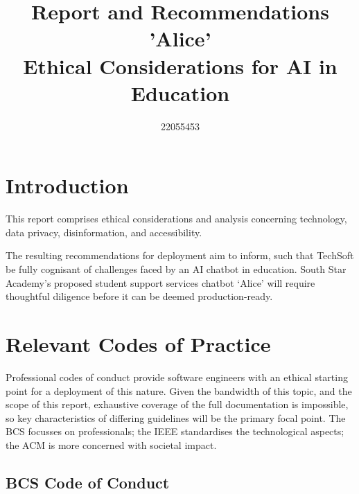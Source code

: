 \documentclass[14pt,a4paper]{article}
\title{Report and Recommendations\\ 'Alice' \\ Ethical Considerations for AI in Education}
\author{22055453}
\date{}
\begin{document}
\maketitle
\thispagestyle{empty}

\newpage

\tableofcontents
{}

\newpage


\begin{multicols}{2}
\section{Introduction}
This report comprises ethical considerations and analysis concerning technology, data privacy, disinformation, and accessibility.

The resulting recommendations for deployment aim to inform, such that TechSoft be fully cognisant of challenges faced by an AI chatbot in education.
South Star Academy's proposed student support services chatbot `Alice' will require thoughtful diligence before it can be deemed production-ready.






\section{Relevant Codes of Practice}

Professional codes of conduct provide software engineers with an ethical starting point for a deployment of this nature.
Given the bandwidth of this topic, and the scope of this report, exhaustive coverage of the full documentation is impossible, so key characteristics of differing guidelines will be the primary focal point.
The BCS focusses on professionals; the IEEE standardises the technological aspects; the ACM is more concerned with societal impact.

\subsection{BCS Code of Conduct}


\end{multicols}
\end{document}
